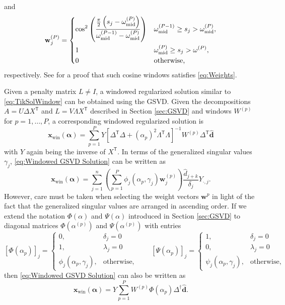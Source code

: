 \documentclass[12pt]{article}
\newcommand{\dVec}{\mathbf{d}}	%
\newcommand{\xVec}{\mathbf{x}}	%
\newcommand{\wVec}{\mathbf{w}}	%
\newcommand{\trans}[1]{{#1}^\mathsf{T}}	%
\newcommand{\inv}[1]{{#1}^{-1}}	%
\newcommand{\pinv}[1]{{#1}^\dagger}	%
\newcommand{\partition}{\omega}  %
\newcommand{\midpoint}{\partition_{\text{mid}}}   %
\newcommand{\dft}[1]{\widehat{#1}}	%
\newcommand{\regparam}{\alpha}  %
\newcommand{\regparamVec}{\bm{\regparam}}   %
\newcommand{\xWin}{\xVec_{\text{win}}}	%
\newcommand{\filt}{\phi}
\newcommand{\mfilt}{\psi}
\newcommand{\singular}{s}	%
\begin{document}
and
\begin{equation}
\label{eq:Last cosine window}
    \wVec_j^{(P)} = \begin{dcases}
    \cos^2\left(\frac{\frac{\pi}{2}\left(\singular_j - \midpoint^{(P)}\right)}{\midpoint^{(P-1)} - \midpoint^{(P)}}\right) & \midpoint^{(P-1)} \geq \singular_j > \midpoint^{(P)}, \\
    1 & \midpoint^{(P)} \geq \singular_j > \omega^{(P)}, \\
    0 & \text{otherwise,}
    \end{dcases}
\end{equation}
respectively. See \cite{Byrne} for a proof that such cosine windows satisfies \eqref{eq:Weights}. \par
Given a penalty matrix $L \neq I$, a windowed regularized solution similar to \eqref{eq:TikSolWindow} can be obtained using the GSVD. Given the decompositions $A = U\Delta\trans{X}$ and $L = V\Lambda\trans{X}$ described in Section \ref{sec:GSVD} and windows $W^{(p)}$ for $p = 1,\ldots,P$, a corresponding windowed regularized solution is
\begin{equation}
\label{eq:Windowed GSVD Solution}
    \xWin(\regparamVec) = \sum_{p=1}^P Y\inv{\left[\trans{\Delta}\Delta + \left(\regparam_{p}\right)^2 \trans{\Lambda}\Lambda\right]}W^{(p)}\trans{\Delta}\dft{\dVec}
\end{equation}
with $Y$ again being the inverse of $\trans{X}$. In terms of the generalized singular values $\gamma_j$, \eqref{eq:Windowed GSVD Solution} can be written as
\begin{equation}
\label{eq:Windowed GSVD Solution Sum}
    \xWin(\regparamVec) = \sum_{j=1}^n \left(\sum_{p=1}^P \filt_j\left(\regparam_{p},\gamma_j\right)\wVec^{(p)}_{j}\right)  \frac{\dft{d}_{j+k}}{\delta_j} Y_{\cdot,j}.
\end{equation}
However, care must be taken when selecting the weight vectors $\wVec^{p}$ in light of the fact that the generalized singular values are arranged in ascending order. If we extend the notation $\Phi(\regparam)$ and $\Psi(\regparam)$ introduced in Section \ref{sec:GSVD} to diagonal matrices $\Phi\left(\regparam^{(p)}\right)$ and $\Psi\left(\regparam^{(p)}\right)$ with entries
\[\left[\Phi\left(\regparam_{p}\right)\right]_j = \begin{cases}
0, & \delta_j = 0 \\
1, & \lambda_j = 0 \\
\filt_j\left(\regparam_{p},\gamma_j\right), & \text{otherwise,}
\end{cases} \qquad
\left[\Psi\left(\regparam_{p}\right)\right]_j = \begin{cases}
1, & \delta_j = 0 \\
0, & \lambda_j = 0 \\
\mfilt_j\left(\regparam_{p},\gamma_j\right), & \text{otherwise,}
\end{cases}\]
then \eqref{eq:Windowed GSVD Solution} can also be written as
\[\xWin(\regparamVec) = Y\sum_{p=1}^P W^{(p)} \Phi\left(\regparam_{p}\right)\pinv{\Delta}\dft{\dVec}.\]
\end{document}
